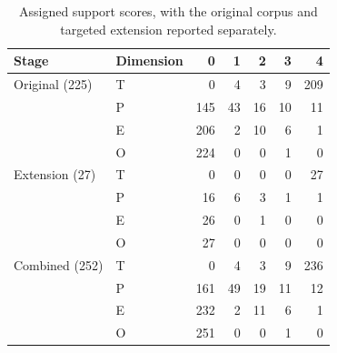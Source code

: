 \begin{table}[htbp]
\centering\small
\caption{Assigned support scores, with the original corpus and targeted extension reported separately.}
\label{tab:scores}
\begin{tabular}{llrrrrr}
\toprule
Stage & Dimension & 0 & 1 & 2 & 3 & 4 \\
\midrule
Original (225) & T & 0 & 4 & 3 & 9 & 209 \\
 & P & 145 & 43 & 16 & 10 & 11 \\
 & E & 206 & 2 & 10 & 6 & 1 \\
 & O & 224 & 0 & 0 & 1 & 0 \\
\midrule
Extension (27) & T & 0 & 0 & 0 & 0 & 27 \\
 & P & 16 & 6 & 3 & 1 & 1 \\
 & E & 26 & 0 & 1 & 0 & 0 \\
 & O & 27 & 0 & 0 & 0 & 0 \\
\midrule
Combined (252) & T & 0 & 4 & 3 & 9 & 236 \\
 & P & 161 & 49 & 19 & 11 & 12 \\
 & E & 232 & 2 & 11 & 6 & 1 \\
 & O & 251 & 0 & 0 & 1 & 0 \\
\bottomrule
\end{tabular}
\end{table}
